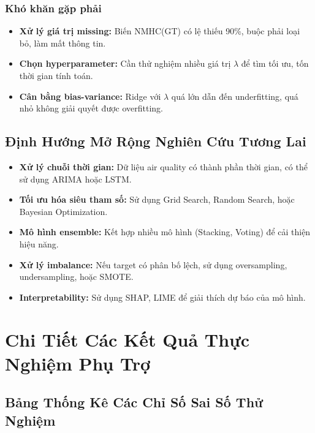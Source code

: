 \documentclass[12pt,a4paper]{report}
\begin{document}
\subsection{Khó khăn gặp phải}
 
\begin{itemize}
    \item \textbf{Xử lý giá trị missing:} Biến NMHC(GT) có lệ thiếu 90\%, buộc phải loại bỏ, làm mất thông tin.
    \item \textbf{Chọn hyperparameter:} Cần thử nghiệm nhiều giá trị $\lambda$ để tìm tối ưu, tốn thời gian tính toán.
    \item \textbf{Cân bằng bias-variance:} Ridge với $\lambda$ quá lớn dẫn đến underfitting, quá nhỏ không giải quyết được overfitting.
\end{itemize}
 
\section{Định Hướng Mở Rộng Nghiên Cứu Tương Lai}
 
\begin{itemize}
    \item \textbf{Xử lý chuỗi thời gian:} Dữ liệu air quality có thành phần thời gian, có thể sử dụng ARIMA hoặc LSTM.
    \item \textbf{Tối ưu hóa siêu tham số:} Sử dụng Grid Search, Random Search, hoặc Bayesian Optimization.
    \item \textbf{Mô hình ensemble:} Kết hợp nhiều mô hình (Stacking, Voting) để cải thiện hiệu năng.
    \item \textbf{Xử lý imbalance:} Nếu target có phân bố lệch, sử dụng oversampling, undersampling, hoặc SMOTE.
    \item \textbf{Interpretability:} Sử dụng SHAP, LIME để giải thích dự báo của mô hình.
\end{itemize}
 
\clearpage
 
\appendix
\chapter{Chi Tiết Các Kết Quả Thực Nghiệm Phụ Trợ}
 
\section{Bảng Thống Kê Các Chỉ Số Sai Số Thử Nghiệm}
 
\end{document}
